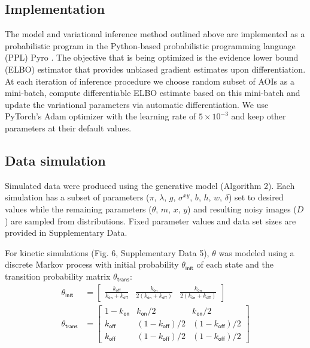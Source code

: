 \subsection*{Implementation}

The model and variational inference method outlined above are implemented as a probabilistic program in the Python-based probabilistic programming language (PPL) Pyro \cite{Foerster2018-kd,Bingham2019-qy,Obermeyer2019-xt}. The objective that is being optimized is the evidence lower bound (ELBO) estimator that provides unbiased gradient estimates upon differentiation. At each iteration of inference procedure we choose random subset of AOIs as a mini-batch, compute differentiable ELBO estimate based on this mini-batch and update the variational parameters via automatic differentiation. We use PyTorch's Adam optimizer with the learning rate of $5\times 10^{-3}$ and keep other parameters at their default values. 

\subsection*{Data simulation}

Simulated data were produced using the generative model (Algorithm 2). Each simulation has a subset of parameters ($\pi$, $\lambda$, $g$, $\sigma^{xy}$, $b$, $h$, $w$, $\delta$) set to desired values while  the remaining parameters ($\theta$, $m$, $x$, $y$) and resulting noisy images ($D$) are sampled from distributions. Fixed parameter values and data set sizes are provided in Supplementary Data.

For kinetic simulations (Fig. 6, Supplementary Data 5), $\theta$ was modeled using a discrete Markov process with initial probability $\theta_\mathsf{init}$ of each state and the transition probability matrix $\theta_\mathsf{trans}$:
%
\begin{subequations}
\begin{align}
    \theta_\mathsf{init} &= \begin{bmatrix} \frac{k_\mathsf{off}}{k_\mathsf{on} + k_\mathsf{off}} & \frac{k_\mathsf{on}}{2\left( k_\mathsf{on} + k_\mathsf{off} \right)} & \frac{k_\mathsf{on}}{2\left( k_\mathsf{on} + k_\mathsf{off} \right)} \end{bmatrix} \\
    \theta_\mathsf{trans} &= \begin{bmatrix} 1 - k_\mathsf{on} & k_\mathsf{on}/2 & k_\mathsf{on}/2 \\ k_\mathsf{off} & (1 - k_\mathsf{off})/2 & (1 - k_\mathsf{off})/2 \\ k_\mathsf{off} & (1 - k_\mathsf{off})/2 & (1 - k_\mathsf{off})/2 \end{bmatrix}
\end{align}
\end{subequations}

